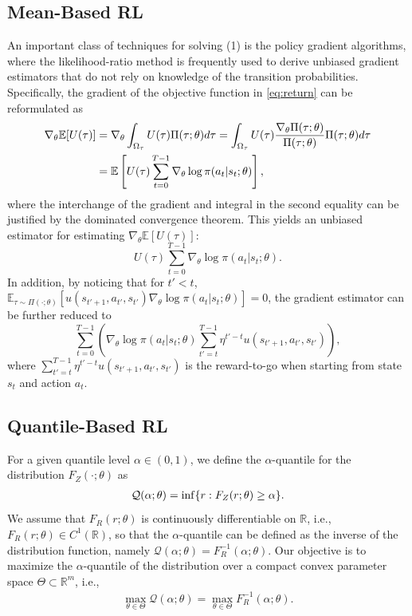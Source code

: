 \subsection{Mean-Based RL}
An important class of techniques for solving (1) is the policy gradient algorithms, where the likelihood-ratio method is frequently used to derive unbiased gradient estimators that do not rely on knowledge of the transition probabilities. Specifically, the gradient of the objective function in \ref{eq:return} can be reformulated as
\begin{align}
\nabla_\theta \mathbb{E}[U(\tau)] 
& = \nabla_\theta \int_{\Omega_\tau} U(\tau)\Pi(\tau;\theta)d\tau = \int_{\Omega_\tau} U(\tau) \frac{\nabla_\theta \Pi(\tau;\theta)}{\Pi(\tau;\theta)} \Pi(\tau;\theta)d\tau  \notag \\
&= \mathbb{E}\left[ U(\tau) \sum_{t=0}^{T-1} \nabla_\theta \log \pi(a_t|s_t;\theta) \right], 
\end{align}
where the interchange of the gradient and integral in the second equality can be justified by the dominated convergence theorem. This yields an unbiased estimator for estimating $\nabla_\theta \mathbb{E}[U(\tau)]$:
$$
U(\tau)\sum_{t=0}^{T-1}\nabla_\theta \log \pi(a_t|s_t;\theta).
$$
In addition, by noticing that for $t' < t$, $\mathbb{E}_{\tau\sim\Pi(\cdot;\theta)}[u(s_{t'+1}, a_{t'}, s_{t'}) \nabla_\theta \log \pi(a_t|s_t;\theta)] = 0$, the gradient estimator can be further reduced to 
$$\sum_{t=0}^{T-1}\left(\nabla_\theta \log \pi(a_t|s_t;\theta) \sum_{t'=t}^{T-1}\eta^{t'-t}u(s_{t'+1}, a_{t'}, s_{t'})\right),$$
where $\sum_{t'=t}^{T-1}\eta^{t'-t}u(s_{t'+1}, a_{t'}, s_{t'})$ is the reward-to-go when starting from state $s_t$ and action $a_t$.

\subsection{Quantile-Based RL}
For a given quantile level $\alpha \in (0,1)$, we define the $\alpha$-quantile for the distribution $F_{Z}(\cdot;\theta)$ as 
\begin{align}
    \notag
    \mathcal{Q}(\alpha;\theta) = \inf\{r: F_{Z}(r;\theta)\geq\alpha\}.
\end{align}
We assume that $F_R(r;\theta)$ is continuously differentiable on $\mathbb{R}$, i.e., $F_R(r;\theta) \in C^{1}(\mathbb{R})$, so that the $\alpha$-quantile can be defined as the inverse of the distribution function, namely $\mathcal{Q}(\alpha;\theta) = F_R^{-1}(\alpha;\theta)$. Our objective is to maximize the $\alpha$-quantile of the distribution over a compact convex parameter space $\Theta \subset \mathbb{R}^m$, i.e.,
\begin{align}
    \max_{\theta \in \Theta} \mathcal{Q}(\alpha;\theta) = \max_{\theta \in \Theta} F_R^{-1}(\alpha;\theta).
\end{align}

